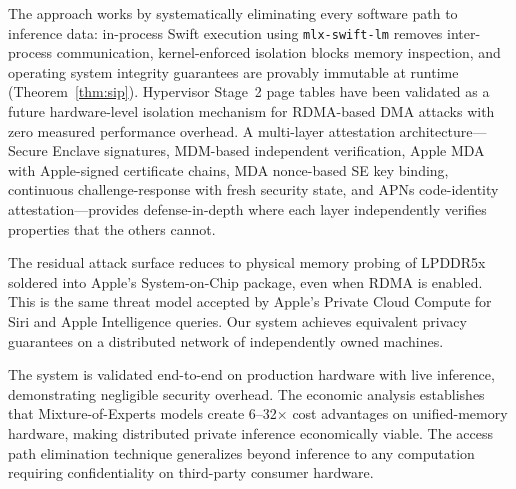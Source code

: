 \documentclass[10pt,twocolumn,letterpaper]{article}
\begin{document}
The approach works by systematically eliminating every software path to inference data: in-process Swift execution using \texttt{mlx-swift-lm} removes inter-process communication, kernel-enforced isolation blocks memory inspection, and operating system integrity guarantees are provably immutable at runtime (Theorem~\ref{thm:sip}). Hypervisor Stage~2 page tables have been validated as a future hardware-level isolation mechanism for RDMA-based DMA attacks with zero measured performance overhead. A multi-layer attestation architecture---Secure Enclave signatures, MDM-based independent verification, Apple MDA with Apple-signed certificate chains, MDA nonce-based SE key binding, continuous challenge-response with fresh security state, and APNs code-identity attestation---provides defense-in-depth where each layer independently verifies properties that the others cannot.

The residual attack surface reduces to physical memory probing of LPDDR5x soldered into Apple's System-on-Chip package, even when RDMA is enabled. This is the same threat model accepted by Apple's Private Cloud Compute for Siri and Apple Intelligence queries. Our system achieves equivalent privacy guarantees on a distributed network of independently owned machines.

The system is validated end-to-end on production hardware with live inference, demonstrating negligible security overhead. The economic analysis establishes that Mixture-of-Experts models create 6--32$\times$ cost advantages on unified-memory hardware, making distributed private inference economically viable. The access path elimination technique generalizes beyond inference to any computation requiring confidentiality on third-party consumer hardware.
\end{document}

